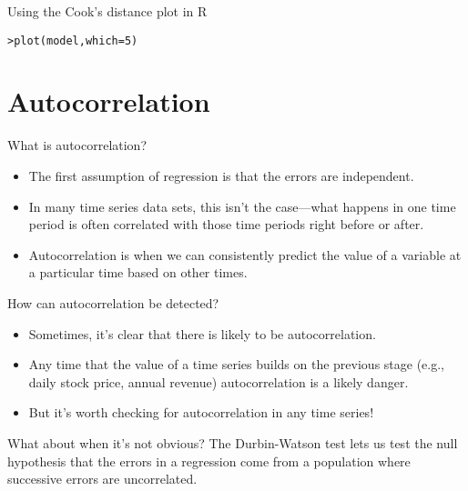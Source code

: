 \documentclass{beamer}\usepackage[]{graphicx}\usepackage[]{color}
\makeatletter
\newcommand{\hlnum}[1]{\textcolor[rgb]{0.824,0.412,0.118}{#1}}%
\newcommand{\hlstd}[1]{\textcolor[rgb]{1,0.894,0.769}{#1}}%
\newcommand{\hlkwc}[1]{\textcolor[rgb]{0.78,0.941,0.545}{#1}}%
\newcommand{\hlkwd}[1]{\textcolor[rgb]{1,0.78,0.769}{#1}}%
\newenvironment{kframe}{%
 \def\at@end@of@kframe{}%
 \ifinner\ifhmode%
  \def\at@end@of@kframe{\end{minipage}}%
  \begin{minipage}{\columnwidth}%
 \fi\fi%
 \def\FrameCommand##1{\hskip\@totalleftmargin \hskip-\fboxsep
 \colorbox{shadecolor}{##1}\hskip-\fboxsep
     \hskip-\linewidth \hskip-\@totalleftmargin \hskip\columnwidth}%
 \MakeFramed {\advance\hsize-\width
   \@totalleftmargin\z@ \linewidth\hsize
   \@setminipage}}%
 {\par\unskip\endMakeFramed%
 \at@end@of@kframe}
\newenvironment{knitrout}{}{} %
\makeatother
\begin{document}
\begin{darkframes}
    \begin{frame}{Using the Cook's distance plot in R}
\begin{knitrout}
\begin{kframe}
\begin{alltt}
\hlstd{> }\hlkwd{plot}\hlstd{(model,} \hlkwc{which}\hlstd{=}\hlnum{5}\hlstd{)}
\end{alltt}
\end{kframe}


\end{knitrout}
    \end{frame}

    \section{Autocorrelation}

    \begin{frame}{What is autocorrelation?}
      \begin{itemize}[<+->]
        \item The first assumption of regression is that the errors are independent.
        \item In many time series data sets, this isn't the case---what happens in one time period is often correlated with those time periods right before or after.
        \item \alert{Autocorrelation} is when we can consistently predict the value of a variable at a particular time based on other times.
      \end{itemize}
    \end{frame}

    \begin{frame}{How can autocorrelation be detected?}
      \begin{itemize}
        \item Sometimes, it's clear that there is likely to be autocorrelation.
        \item Any time that the value of a time series builds on the previous stage (e.g., daily stock price, annual revenue) autocorrelation is a likely danger.
        \item But it's worth checking for autocorrelation in any time series!
      \end{itemize}
    \end{frame}

    \begin{frame}{What about when it's not obvious?}
      The \alert{Durbin-Watson test} lets us test the null hypothesis that the errors in a regression come from a population where successive errors are uncorrelated.


\end{frame}
\end{darkframes}
\end{document}
